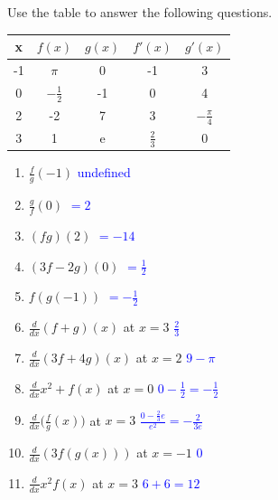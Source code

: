 \documentclass{ximera}
\begin{document}
\begin{exercise}
    Use the table to answer the following questions.\\  
    \begin{tabular}{c|c|c|c|c}
        x  & $f(x)$ & $g(x)$ & $f'(x)$ & $g'(x)$   \\ \hline
        -1  & $\pi$ & 0 & -1 & 3\\ \hline
        0 & $-\frac12$ & -1 & 0 & 4\\ \hline
        2 & -2 & 7 & 3 & $-\frac{\pi}{4}$ \\ \hline
        3 & 1 & e & $\frac23$ & 0\\%
    \end{tabular}
    \begin{enumerate}
       \item $\frac{f}{g}(-1)$ \textcolor{blue}{ undefined}
        \item $\frac{g}{f}(0)$ \textcolor{blue}{ $=2$}
        \item $(fg)(2)$ \textcolor{blue}{ $=-14$}
        \item $(3f-2g)(0)$ \textcolor{blue}{ $=\frac12$}
        \item $f(g(-1))$ \textcolor{blue}{ $=-\frac12$}
        \item $\frac{d}{dx} (f+g)(x)$ at $x=3$ \textcolor{blue}{ $\frac23$}
        \item $\frac{d}{dx} (3f+4g)(x)$ at $x=2$ \textcolor{blue}{ $9-\pi$}
        \item $\frac{d}{dx} x^2+f(x)$ at $x=0$ \textcolor{blue}{ $0-\frac12=-\frac12$}
        \item $\frac{d}{dx} \big(\frac{f}{g}(x)\big)$ at $x=3$ \textcolor{blue}{ $\frac{0-\frac{2}{3}e}{e^2}=-\frac{2}{3e}$}
        \item $\frac{d}{dx} (3f(g(x)))$ at $x=-1$ \textcolor{blue}{ $0$}
        \item $\frac{d}{dx} x^2f(x)$ at $x=3$ \textcolor{blue}{ $6+6=12$}
    \end{enumerate}
\end{exercise}
\end{document}
